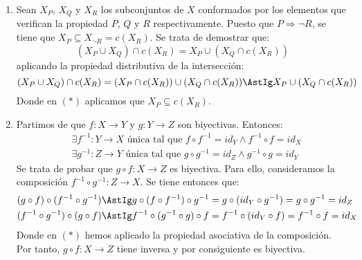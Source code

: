 \documentclass[12pt]{article}
\begin{document}
\begin{ejercicio}[3 puntos]
        \begin{enumerate}[label=(\alph*)]
            \item Sean $X_P$, $X_Q$ y $X_R$ los subconjuntos de $X$ conformados por los elementos que verifican la propiedad $P$, $Q$ y $R$ respectivamente. Puesto que $P\Longrightarrow \lnot R$, se tiene que $X_P\subseteq X_{\lnot R} = c(X_R)$. Se trata de demostrar que:
                \begin{equation*}
                    (X_P \cup X_Q) \cap c(X_R) = X_P \cup (X_Q \cap c(X_R))
                \end{equation*}
                aplicando la propiedad distributiva de la intersección:
                \begin{equation*}
                    (X_P \cup X_Q) \cap c(X_R) = (X_P \cap c(X_R)) \cup (X_Q \cap c(X_R)) \AstIg X_P \cup (X_Q \cap c(X_R))
                \end{equation*}
                Donde en $(\ast)$ aplicamos que $X_P\subseteq c(X_R)$.
            \item Partimos de que $f:X\rightarrow Y$ y $g:Y\rightarrow Z$ son biyectivas. Entonces:
                \begin{align*}
                    &\exists f^{-1}:Y\rightarrow X \text{\ única tal que\ } f\circ f^{-1} = id_Y \land f^{-1} \circ f = id_X \\
                    &\exists g^{-1}:Z\rightarrow Y \text{\ única tal que\ } g\circ g^{-1} = id_Z \land g^{-1} \circ g = id_Y 
                \end{align*}
                Se trata de probar que $g\circ f:X\rightarrow Z$ es biyectiva. Para ello, consideramos la composición $f^{-1}\circ g^{-1}:Z\rightarrow X$. Se tiene entonces que:
                \begin{align*}
                    (g\circ f) \circ (f^{-1}\circ g^{-1}) &\AstIg g\circ (f\circ f^{-1})\circ g^{-1} = g\circ (id_Y \circ g^{-1}) = g\circ g^{-1} = id_Z \\
                    (f^{-1}\circ g^{-1})\circ (g\circ f)&\AstIg f^{-1}\circ (g^{-1}\circ g) \circ f = f^{-1} \circ  (id_Y \circ f) = f^{-1} \circ f = id_X
                \end{align*}
                Donde en $(\ast)$ hemos aplicado la propiedad asociativa de la composición. Por tanto, $g \circ f:X\rightarrow Z$ tiene inversa y por consiguiente es biyectiva.


\end{enumerate}
\end{ejercicio}
\end{document}

